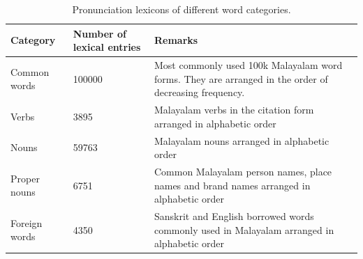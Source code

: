 \documentclass{ieeeaccess}
\begin{document}
\begin{table}[ht]
\centering
	\begin{center}
		\begin{minipage}{\textwidth}
			\caption{Pronunciation lexicons of different word categories.}
			\label{dictionaries}
			\begin{tabular}{@{}p{1.8cm}p{3cm}p{12cm}@{}}
				\hline
				\hline
				\textbf{Category} & \textbf{Number of lexical entries} & \textbf{Remarks}                                                                                                   \\
				\hline
				Common words      & 100000                             & Most commonly used 100k Malayalam word forms. They are arranged in the order of decreasing frequency. \\
				Verbs             & 3895                               & Malayalam verbs in the citation form arranged in alphabetic order                                                  \\
				Nouns             & 59763                              & Malayalam nouns arranged in alphabetic order                                                                       \\
				Proper nouns      & 6751                               & Common Malayalam person names, place names and brand names arranged in alphabetic order                            \\
				Foreign words     & 4350                               & Sanskrit and English borrowed words commonly used in Malayalam arranged in alphabetic order                        \\

				\hline
			\end{tabular}
		\end{minipage}
	\end{center}
\end{table}

\end{document}
